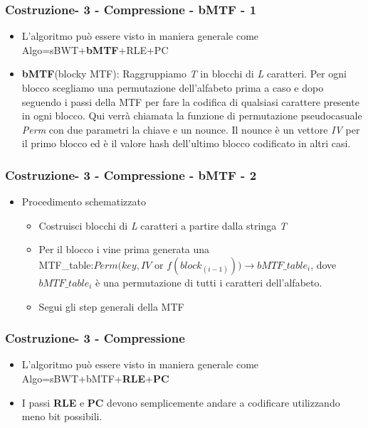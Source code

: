 \documentclass{beamer}
\begin{document}
\begin{frame}
\frametitle{Costruzione- 3 - Compressione - bMTF - 1}
	\begin{itemize}
		\item L’algoritmo può essere visto in maniera generale come Algo=sBWT+\textbf{bMTF}+RLE+PC\pause
		\item \textbf{bMTF}(blocky MTF): Raggruppiamo \textit{T} in blocchi di \textit{L} caratteri. Per ogni blocco scegliamo una permutazione dell’alfabeto prima a caso e dopo seguendo i passi della MTF per fare la codifica di qualsiasi carattere presente in ogni blocco. Qui verrà chiamata la funzione di permutazione pseudocasuale \textit{Perm} con due parametri la chiave e un nounce. Il nounce è un vettore \textit{IV} per il primo blocco ed è il valore hash dell’ultimo blocco codificato in altri casi.
		
	\end{itemize}
\end{frame}


\begin{frame}
\frametitle{Costruzione- 3 - Compressione - bMTF - 2}
	\begin{itemize}
	\item Procedimento schematizzato\pause
		\begin{itemize}
			\item Costruisci blocchi di \textit{L} caratteri a partire dalla stringa \textit{T}\pause
			\item Per il blocco i vine prima generata una\\ MTF\_table:$ Perm(key,IV$ or $f(block_{(i-1)}))\rightarrow bMTF\_table_{i} $, dove $ bMTF\_table_{i} $ è una permutazione di tutti i caratteri dell'alfabeto.\pause
			\item Segui gli step generali della MTF\pause
		\end{itemize}	 
	\end{itemize}
\end{frame}

\begin{frame}
\frametitle{Costruzione- 3 - Compressione }
	\begin{itemize}
		\item L’algoritmo può essere visto in maniera generale come Algo=sBWT+bMTF+\textbf{RLE}+\textbf{PC}\pause
		\item I passi \textbf{RLE} e \textbf{PC} devono semplicemente andare a codificare utilizzando meno bit possibili. \pause
	\end{itemize}
\end{frame}
\end{document}

